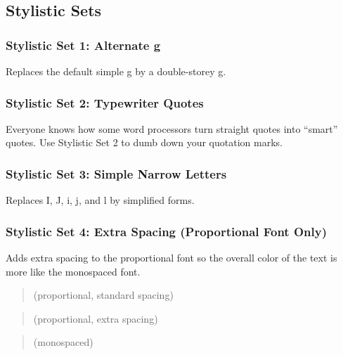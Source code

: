 \subsection{Stylistic Sets}

\subsubsection{Stylistic Set 1: Alternate g}
Replaces the default simple g by a double-storey g.
\begin{quote}
{ \sample}
\end{quote}

\subsubsection{Stylistic Set 2: Typewriter Quotes}
Everyone knows how some word processors turn straight quotes into “smart” quotes. Use Stylistic Set 2 to dumb down your quotation marks.
\begin{quote}
{ \sample}
\end{quote}

\subsubsection{Stylistic Set 3: Simple Narrow Letters}
Replaces I, J, i, j, and l by simplified forms.
\begin{quote}
{ \sample}
\end{quote}

\subsubsection{Stylistic Set 4: Extra Spacing (Proportional Font Only)}

Adds extra spacing to the proportional font so the overall color of the text is more like the monospaced font.

\begin{quote}\raggedright
{\setmainfont{SudoUIVariable.ttf} \sample{} (proportional, standard spacing)}
\end{quote}
\begin{quote}\raggedright
{\setmainfont{SudoUIVariable.ttf}  \sample{} (proportional, extra spacing)}
\end{quote}
\begin{quote}\raggedright
{ \sample{} (monospaced)}
\end{quote}

